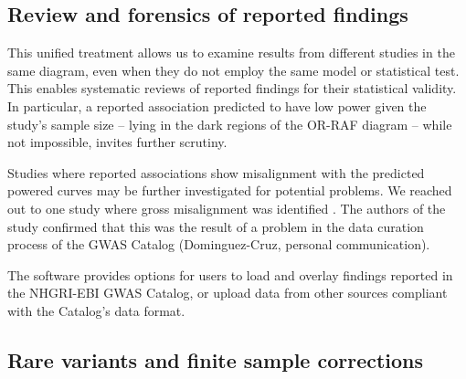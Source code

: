 \vspace{-5pt}
\subsection{Review and forensics of reported findings}

This unified treatment allows us to examine results from different studies in the same diagram, even when they do not employ the same model or statistical test.
This enables systematic reviews of reported findings for their statistical validity. 
In particular, a reported association predicted to have low power given the study's sample size -- lying in the dark regions of the OR-RAF diagram -- while not impossible, invites further scrutiny.%

Studies where reported associations show misalignment with the predicted powered curves may be further investigated for potential problems.
We reached out to one study where gross misalignment was identified \citep{Dominguez-Cruz18}. 
The authors of the study confirmed that this was the result of a problem in the data curation process of the GWAS Catalog (Dominguez-Cruz, personal communication).

The software provides options for users to load and overlay findings reported in the NHGRI-EBI GWAS Catalog, or upload data from other sources compliant with the Catalog's data format.



\vspace{-5pt}
\subsection{Rare variants and finite sample corrections}


